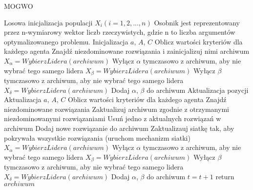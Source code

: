 \begin{algorithm}[H]
\caption{MOGWO}
\begin{algorithmic}
\STATE Losowa inicjalizacja populacji $X_i (i = 1, 2, ..., n)$ Osobnik jest reprezentowany przez n-wymiarowy wektor liczb rzeczywistych, gdzie n to liczba argumentów optymalizowanego problemu.
\STATE Inicjalizacja $a$, $A$, $C$
\STATE Oblicz wartości kryteriów dla każdego agenta
\STATE Znajdź niezdominowane rozwiązania i zainicjalizuj nimi archiwum
\STATE $X_{\alpha} = WybierzLidera(archiwum)$
\STATE Wyłącz $\alpha$ tymczasowo z archiwum, aby nie wybrać tego samego lidera
\STATE $X_{\beta} = WybierzLidera(archiwum)$ 
\STATE Wyłącz $\beta$ tymczasowo z archiwum,  aby nie wybrać tego samego lidera
\STATE $X_{\delta} = WybierzLidera(archiwum)$
\STATE Dodaj $\alpha$, $\beta$ do archiwum
        \STATE Aktualizacja pozycji 
    \ENDFOR
    \STATE Aktualizacja $a$, $A$, $C$
    \STATE Oblicz wartości kryteriów dla każdego agenta
    \STATE Znajdź niezdominowane rozwiązania
    \STATE Zaktualizuj archiwum zgodnie z otrzymanymi niezdominowanymi rozwiązaniami
    	\STATE Usuń jedno z aktualnych rozwiązań w archiwum
    	\STATE Dodaj nowe rozwiązanie do archiwum 
    \ENDIF
    	\STATE Zaktualizauj siatkę tak, aby pokrywała wszystkie rozwiązania (uruchom mechanizm siatki)
    \ENDIF
    \STATE $X_{\alpha} = WybierzLidera(archiwum)$
	\STATE Wyłącz $\alpha$ tymczasowo z archiwum, aby nie wybrać tego samego lidera
	\STATE $X_{\beta} = WybierzLidera(archiwum)$ 
	\STATE Wyłącz $\beta$ tymczasowo z archiwum,  aby nie wybrać tego samego lidera
	\STATE $X_{\delta} = WybierzLidera(archiwum)$
	\STATE Dodaj $\alpha$, $\beta$ do archiwum
    \STATE $t = t + 1$
\ENDWHILE
\STATE return $archiwum$
\end{algorithmic}
\end{algorithm}